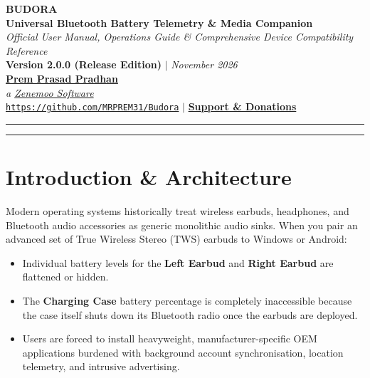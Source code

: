 \documentclass[11pt,a4paper]{article}
\begin{document}
\begin{center}
    {\Huge \textbf{\color{BudoraDark} BUDORA \raisebox{1pt}{\large \color{BudoraGreen} \textbullet}}} \\[6pt]
    {\Large \textbf{Universal Bluetooth Battery Telemetry \& Media Companion}} \\[4pt]
    {\large \textit{Official User Manual, Operations Guide \& Comprehensive Device Compatibility Reference}} \\[8pt]
    {\large \textbf{\color{BudoraPurple} Version 2.0.0 (Release Edition)} \quad $\vert$ \quad \textit{November 2026}} \\[14pt]
    
    \textbf{\href{https://mrprem.in/}{Prem Prasad Pradhan}} \\
    \textit{a \href{https://www.zenemoo.in/}{Zenemoo Software}} \\[8pt]
    
    \href{https://github.com/MRPREM31/Budora}{\texttt{https://github.com/MRPREM31/Budora}} \quad $\vert$ \quad
    \href{https://www.zenemoo.in/support-zenemooindia}{\textbf{\color{BudoraPurple} Support \& Donations}} \\[14pt]
    \rule{\linewidth}{1.2pt}
\end{center}

\vspace{0.5cm}

\tableofcontents

\vspace{0.8cm}
\hrule
\vspace{0.8cm}

\section{Introduction \& Architecture}

Modern operating systems historically treat wireless earbuds, headphones, and Bluetooth audio accessories as generic monolithic audio sinks. When you pair an advanced set of True Wireless Stereo (TWS) earbuds to Windows or Android:
\begin{itemize}
    \item Individual battery levels for the \textbf{Left Earbud} and \textbf{Right Earbud} are flattened or hidden.
    \item The \textbf{Charging Case} battery percentage is completely inaccessible because the case itself shuts down its Bluetooth radio once the earbuds are deployed.
    \item Users are forced to install heavyweight, manufacturer-specific OEM applications burdened with background account synchronisation, location telemetry, and intrusive advertising.
\end{itemize}
\end{document}
